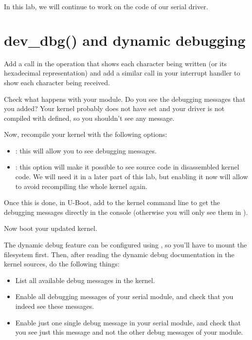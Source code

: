 
In this lab, we will continue to work on the code of our serial driver.

\section{dev\_dbg() and dynamic debugging}

Add a  call in the  operation that shows
each character being written (or its hexadecimal representation) and
add a similar  call in your interrupt handler to show
each character being received.

Check what happens with your module. Do you see the debugging messages
that you added? Your kernel probably does not have
 set and your driver is not compiled with
 defined, so you shouldn't see any message.

Now, recompile your kernel with the following options:

\begin{itemize}
\item {}: this will allow you to see
  debugging messages.
\item {}: this option will make it
  possible to see source code in disassembled kernel code.
  We will need it in a later part of this lab, but enabling
  it now will allow to avoid recompiling the whole kernel again.
\end{itemize}

Once this is done, in U-Boot, add  to the kernel
command line to get the debugging messages directly in the console
(otherwise you will only see them in ).

Now boot your updated kernel.

The dynamic debug feature can be configured using , so you'll have
to mount the  filesystem first. Then, after reading the dynamic
debug documentation in the kernel sources, do the following things:

\begin{itemize}

\item List all available debug messages in the kernel.

\item Enable all debugging messages of your serial module, and check
  that you indeed see these messages.

\item Enable just one single debug message in your serial module, and
  check that you see just this message and not the other debug
  messages of your module.

\end{itemize}

